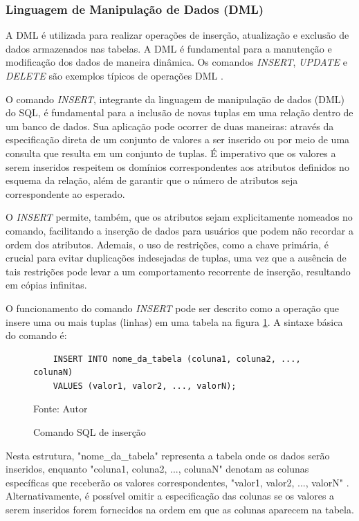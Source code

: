 \subsubsection{Linguagem de Manipulação de Dados (DML)}

A DML é utilizada para realizar operações de inserção, atualização e exclusão de dados armazenados nas tabelas. A DML é fundamental para a manutenção e modificação dos dados de maneira dinâmica. Os comandos \textit{INSERT}, \textit{UPDATE} e \textit{DELETE} são exemplos típicos de operações DML \cite{silberschatz2011database}.


O comando \textit{INSERT}, integrante da linguagem de manipulação de dados (DML) do SQL, é fundamental para a inclusão de novas tuplas em uma relação dentro de um banco de dados. Sua aplicação pode ocorrer de duas maneiras: através da especificação direta de um conjunto de valores a ser inserido ou por meio de uma consulta que resulta em um conjunto de tuplas. É imperativo que os valores a serem inseridos respeitem os domínios correspondentes aos atributos definidos no esquema da relação, além de garantir que o número de atributos seja correspondente ao esperado.\cite{silberschatz2011database} 

O \textit{INSERT} permite, também, que os atributos sejam explicitamente nomeados no comando, facilitando a inserção de dados para usuários que podem não recordar a ordem dos atributos. Ademais, o uso de restrições, como a chave primária, é crucial para evitar duplicações indesejadas de tuplas, uma vez que a ausência de tais restrições pode levar a um comportamento recorrente de inserção, resultando em cópias infinitas.\cite{silberschatz2011database}

O funcionamento do comando \textit{INSERT} pode ser descrito como a operação que insere uma ou mais tuplas (linhas) em uma tabela na figura \ref{lst:sql_insert}. A sintaxe básica do comando é:

\begin{figure}[h!]
    \centering
    \begin{lstlisting}
    INSERT INTO nome_da_tabela (coluna1, coluna2, ..., colunaN) 
    VALUES (valor1, valor2, ..., valorN);
    \end{lstlisting}
    \caption{Comando SQL de inserção}
    Fonte: Autor
    \label{lst:sql_insert}
\end{figure}



Nesta estrutura, "nome\_da\_tabela" representa a tabela onde os dados serão inseridos, enquanto "coluna1, coluna2, ..., colunaN" denotam as colunas específicas que receberão os valores correspondentes, "valor1, valor2, ..., valorN" \cite{silberschatz2011database}. Alternativamente, é possível omitir a especificação das colunas se os valores a serem inseridos forem fornecidos na ordem em que as colunas aparecem na tabela.

